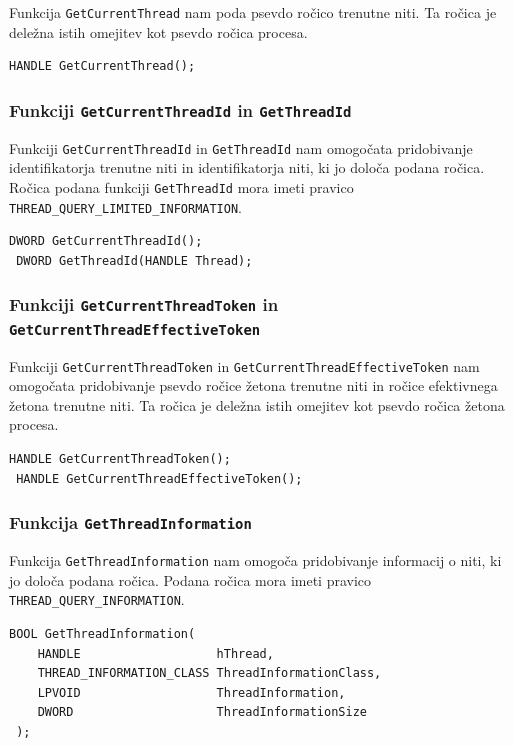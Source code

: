 \documentclass[a4paper,12pt,openright]{book}
\begin{document}
Funkcija \texttt{GetCurrentThread} nam poda psevdo ročico trenutne niti.
Ta ročica je deležna istih omejitev kot psevdo ročica procesa.

\begin{lstlisting}[style=func]
 HANDLE GetCurrentThread();
\end{lstlisting}

\subsubsection{Funkciji \texttt{GetCurrentThreadId} in \texttt{GetThreadId}}

Funkciji \texttt{GetCurrentThreadId} in \texttt{GetThreadId} nam omogočata pridobivanje identifikatorja trenutne niti in identifikatorja niti, ki jo določa podana ročica.
Ročica podana funkciji \texttt{GetThreadId} mora imeti pravico \texttt{THREAD\_QUERY\-\_LIMITED\-\_INFORMATION}.

\begin{lstlisting}[style=func]
 DWORD GetCurrentThreadId();
 DWORD GetThreadId(HANDLE Thread);
\end{lstlisting}

\subsubsection{Funkciji \texttt{GetCurrentThreadToken} in \texttt{GetCurrentThreadEffectiveToken}}

Funkciji \texttt{GetCurrentThreadToken} in \texttt{GetCurrentThreadEffectiveToken} nam omogočata pridobivanje psevdo ročice žetona trenutne niti in ročice efektivnega žetona trenutne niti.
Ta ročica je deležna istih omejitev kot psevdo ročica žetona procesa.

\begin{lstlisting}[style=func]
 HANDLE GetCurrentThreadToken();
 HANDLE GetCurrentThreadEffectiveToken();
\end{lstlisting}

\subsubsection{Funkcija \texttt{GetThreadInformation}}

Funkcija \texttt{GetThreadInformation} nam omogoča pridobivanje informacij o niti, ki jo določa podana ročica.
Podana ročica mora imeti pravico \texttt{THREAD\-\_QUERY\_INFORMATION}.

\begin{lstlisting}[style=func]
 BOOL GetThreadInformation(
	HANDLE                   hThread,
	THREAD_INFORMATION_CLASS ThreadInformationClass,
	LPVOID                   ThreadInformation,
	DWORD                    ThreadInformationSize
 );
\end{lstlisting}
\end{document}
